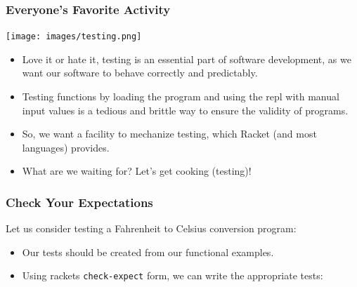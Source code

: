 \documentclass{beamer}
\begin{document}
\begin{frame}
  \frametitle{Everyone's Favorite Activity}
  \begin{center}
    \texttt{[image: images/testing.png]}
  \end{center}
  \begin{itemize}
  \item<2-> Love it or hate it, testing is an essential part of software development, as we want our software to behave correctly and predictably. 
  \item<3-> Testing functions by loading the program and using the repl with manual input values is a tedious and brittle way to ensure the validity of programs.
  \item<4-> So, we want a facility to mechanize testing, which Racket (and most languages) provides.
  \item<5-> What are we waiting for? Let's get cooking (testing)!
  \end{itemize}
\end{frame}



\begin{frame}
  \frametitle{Check Your Expectations}
  Let us consider testing a Fahrenheit to Celsius conversion program:
  \testProgram
  \begin{itemize}
  \item<2-> Our tests should be created from our functional examples.
  \item<3-> Using rackets \texttt{check-expect} form, we can write the appropriate tests:
    \tests
  \end{itemize}
\end{frame}
\end{document}
